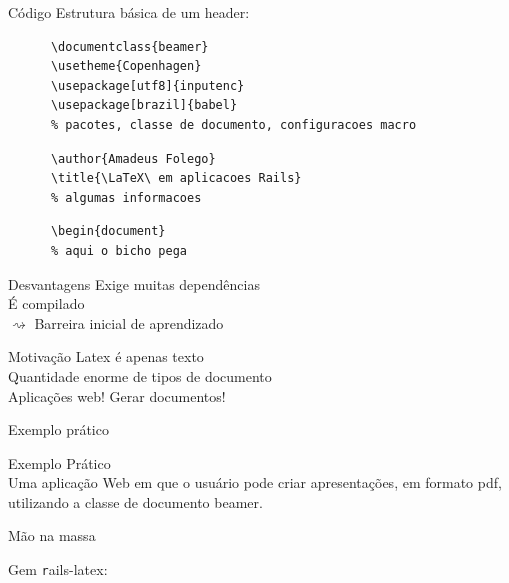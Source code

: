 \documentclass{beamer}
\begin{document}
  \begin{frame}[fragile]{Código}
    Estrutura básica de um header:
    \begin{verbatim}
      \documentclass{beamer}
      \usetheme{Copenhagen}
      \usepackage[utf8]{inputenc}
      \usepackage[brazil]{babel}
      % pacotes, classe de documento, configuracoes macro
    \end{verbatim}
    \pause\begin{verbatim}
      \author{Amadeus Folego}
      \title{\LaTeX\ em aplicacoes Rails}
      % algumas informacoes
    \end{verbatim}
    \pause\begin{verbatim}
      \begin{document}
      % aqui o bicho pega
    \end{verbatim}
\end{frame}
  \begin{frame}{Desvantagens}
     Exige muitas dependências\\\pause
    \onslide<2->{ $ \rightsquigarrow $ } É compilado\\\pause
     Barreira inicial de aprendizado
  \end{frame}
  \begin{frame}{Motivação} 
    \onslide<1>{$ \nabla $} Latex é apenas texto\\\pause
     Quantidade enorme de tipos de documento\\\pause
     Aplicações web! Gerar documentos!\\
  \end{frame}
  \begin{frame}{Exemplo prático} 
    \begin{center} 
      {\Huge Exemplo Prático}\\[1em]
      Uma aplicação Web em que o usuário pode criar apresentações, em formato pdf, utilizando a classe de documento beamer.
    \end{center}
  \end{frame}
  \begin{frame}{Mão na massa} 
    \begin{center} 
      \Large Gem {\texttt rails-latex}: \href{https://github.com/jacott/rails-latex}{} 
    \end{center}
  \end{frame}
  \begin{frame}[plain] 
    \titlepage
  \end{frame}
\end{document}
